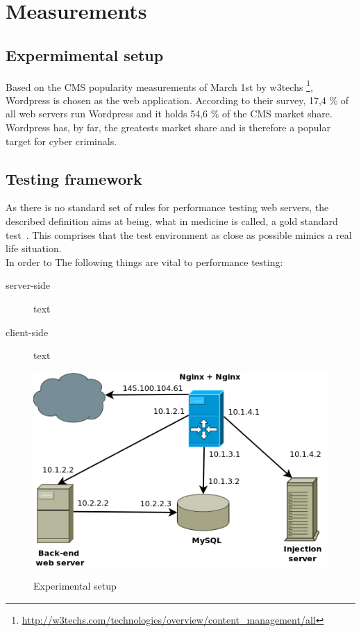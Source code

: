 \documentclass[Measurements]{subfiles}
\begin{document}
\section{Measurements}
\label{sec:Measurements}

\subsection{Expermimental setup}
Based on the \ac{CMS} popularity measurements of March 1st by w3techs \footnote{\url{http://w3techs.com/technologies/overview/content_management/all}}, Wordpress is chosen as the web application. According to their survey, 17,4 \% of all web servers run Wordpress and it holds 54,6 \% of the CMS market share. Wordpress has, by far, the greatests market share and is therefore a popular target for cyber criminals.

\subsection{Testing framework}
As there is no standard set of rules for performance testing web servers, the described definition aims at being, what in medicine is called, a gold standard test~\cite{wacholder1993validation}. This comprises that the test environment as close as possible mimics a real life situation. \\ 
In order to The following things are vital to performance testing:

\begin{description} 
 \item[server-side] text 
 \item[client-side] text
\end{description}

\begin{figure}[h]
\caption{Experimental setup}
\centering
\includegraphics[scale=0.4] {images/infrastructure.png}
\label{fig:Experimental setup}
\end{figure}
\end{document}
